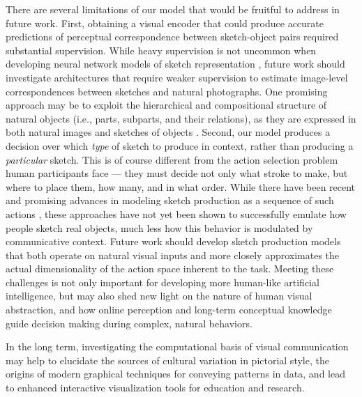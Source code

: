\documentclass[9pt,twocolumn,twoside]{pnas-new}
\begin{document}

There are several limitations of our model that would be fruitful to address in future work. 
First, obtaining a visual encoder that could produce accurate predictions of perceptual correspondence between sketch-object pairs required substantial supervision. 
While heavy supervision is not uncommon when developing neural network models of sketch representation \cite{sangkloy2016sketchy,yu2017sketch,song2017deep}, future work should investigate architectures that require weaker supervision to estimate image-level correspondences between sketches and natural photographs. 
One promising approach may be to exploit the hierarchical and compositional structure of natural objects (i.e., parts, subparts, and their relations), as they are expressed in both natural images and sketches of objects \cite{battaglia2016interaction,mrowca2018graph}.
Second, our model produces a decision over which \textit{type} of sketch to produce in context, rather than producing a \textit{particular} sketch.  
This is of course different from the action selection problem human participants face --- they must decide not only what stroke to make, but where to place them, how many, and in what order.
While there have been recent and promising advances in modeling sketch production as a sequence of such actions \cite{lake2015human,ha2017neural,ganin2018synthesizing}, these approaches have not yet been shown to successfully emulate how people sketch real objects, much less how this behavior is modulated by communicative context. 
Future work should develop sketch production models that both operate on natural visual inputs and more closely approximates the actual dimensionality of the action space inherent to the task.
Meeting these challenges is not only important for developing more human-like artificial intelligence, but may also shed new light on the nature of human visual abstraction, and how online perception and long-term conceptual knowledge guide decision making during complex, natural behaviors. 

In the long term, investigating the computational basis of visual communication may help to elucidate the sources of cultural variation in pictorial style, the origins of modern graphical techniques for conveying patterns in data, and lead to enhanced interactive visualization tools for education and research.
\end{document}
